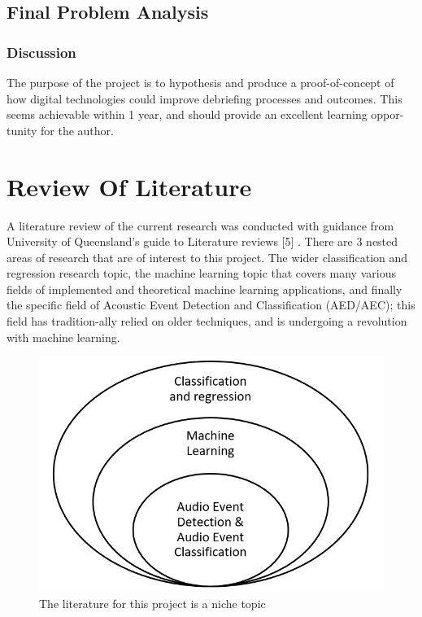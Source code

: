 \documentclass{UoNMCHA}
\numberwithin{equation}{section}
\begin{document}
\subsection{Final Problem Analysis}
\subsubsection{Discussion}
The purpose of the project is to hypothesis and produce a proof-of-concept of how digital technologies could improve debriefing processes and outcomes. This seems achievable within 1 year, and should provide an excellent learning oppor-tunity for the author.

\section{Review Of Literature}
A literature review of the current research was conducted with guidance from University of Queensland’s guide to Literature reviews [5] . There are 3 nested areas of research that are of interest to this project. The wider classification and regression research topic, the machine learning topic that covers many various fields of implemented and theoretical machine learning applications, and finally the specific field of Acoustic Event Detection and Classification (AED/AEC); this field has tradition-ally relied on older techniques, and is undergoing a revolution with machine learning. 
\begin{figure}[ht]
    \begin{center}
        \includegraphics[width=.6\linewidth]{Figures/niche.PNG}
        \caption{The literature for this project is a niche topic}
        \label{fig:Sinc}
    \end{center}
\end{figure}
\end{document}
